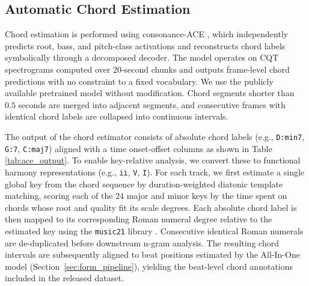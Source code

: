 \documentclass{article}
\newcommand{\rev}[1]{{\color{r2}#1}} %
\begin{document}
\subsection{Automatic Chord Estimation}
\label{sec:ace_pipeline}
Chord estimation is performed using consonance-ACE \citep{poltronieri2025discord}, which independently predicts root, bass, and pitch-class activations and reconstructs chord labels symbolically through a decomposed decoder. The model operates on CQT spectrograms computed over 20-second chunks and outputs frame-level chord predictions with no constraint to a fixed vocabulary. We use the publicly available pretrained model without modification. Chord segments shorter than $0.5$ seconds are merged into adjacent segments, and consecutive frames with identical chord labels are collapsed into continuous intervals.

The output of the chord estimator consists of absolute chord labels (e.g., \texttt{D:min7}, \texttt{G:7}, \texttt{C:maj7}) aligned with a time onset-offset columns as shown in Table \ref{tab:ace_output}. To enable key-relative analysis, we convert these to functional harmony representations (e.g., \texttt{ii}, \texttt{V}, \texttt{I}). \rev{For each track, we first estimate a single global key from the chord sequence by duration-weighted diatonic template matching, scoring each of the 24 major and minor keys by the time spent on chords whose root and quality fit its scale degrees.} Each absolute chord label is then mapped to its corresponding Roman numeral degree relative to the estimated key using the \texttt{music21} library \citep{cuthbert2010music21}. Consecutive identical Roman numerals are de-duplicated before downstream n-gram analysis. The resulting chord intervals are subsequently aligned to beat positions estimated by the All-In-One model (Section~\ref{sec:form_pipeline}), yielding the beat-level chord annotations included in the released dataset.
\end{document}
